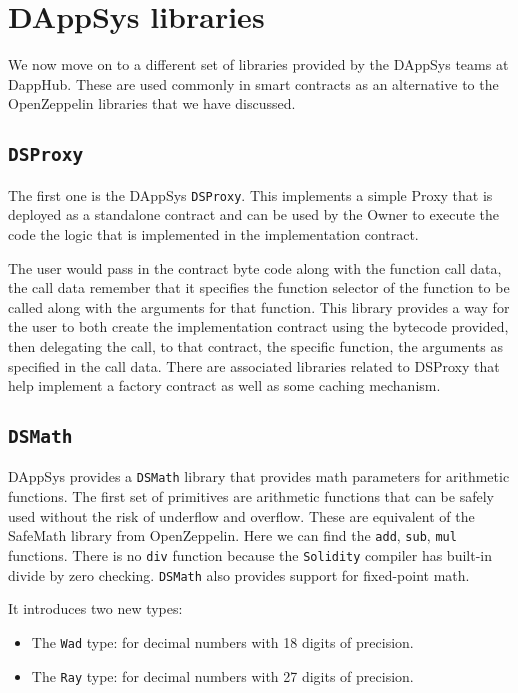\section{DAppSys libraries}\label{dappsys-libraries}

We now move on to a different set of libraries provided by the DAppSys
teams at DappHub. These are used commonly in smart contracts as an
alternative to the OpenZeppelin libraries that we have discussed.

\subsection{\texorpdfstring{\texttt{DSProxy}}{DSProxy}}\label{dsproxy}

The first one is the DAppSys \texttt{DSProxy}. This implements a simple
Proxy that is deployed as a standalone contract and can be used by the
Owner to execute the code the logic that is implemented in the
implementation contract.

The user would pass in the contract byte code along with the function
call data, the call data remember that it specifies the function
selector of the function to be called along with the arguments for that
function. This library provides a way for the user to both create the
implementation contract using the bytecode provided, then delegating the
call, to that contract, the specific function, the arguments as
specified in the call data. There are associated libraries related to
DSProxy that help implement a factory contract as well as some caching
mechanism.

\subsection{\texorpdfstring{\texttt{DSMath}}{DSMath}}\label{dsmath}

DAppSys provides a \texttt{DSMath} library that provides math parameters
for arithmetic functions. The first set of primitives are arithmetic
functions that can be safely used without the risk of underflow and
overflow. These are equivalent of the SafeMath library from
OpenZeppelin. Here we can find the \texttt{add}, \texttt{sub},
\texttt{mul} functions. There is no \texttt{div} function because the
\texttt{Solidity} compiler has built-in divide by zero checking.
\texttt{DSMath} also provides support for fixed-point math.

It introduces two new types:

\begin{itemize}
\tightlist
\item
  The \texttt{Wad} type: for decimal numbers with 18 digits of
  precision.
\item
  The \texttt{Ray} type: for decimal numbers with 27 digits of
  precision.
\end{itemize}


